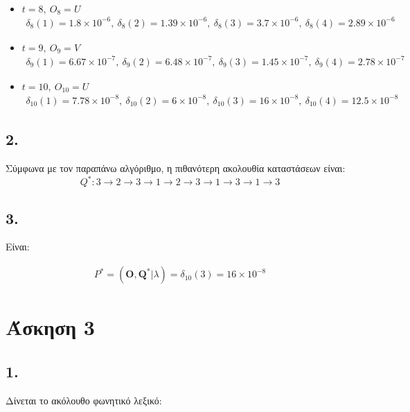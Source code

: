 \documentclass[12pt,a4paper]{article}
\begin{document}
\begin{itemize}
					\item $t=8, ~ O_8=U$
					\begin{align*}
						\delta_8\left(1\right) = 1.8\times10^{-6}, ~
						\delta_8\left(2\right) = 1.39\times10^{-6}, ~
						\boxed{\delta_8\left(3\right) = 3.7\times10^{-6}}, ~
						\delta_8\left(4\right) = 2.89\times10^{-6}
					\end{align*}

					\item $t=9, ~ O_9=V$
					\begin{align*}
						\boxed{\delta_9\left(1\right) = 6.67\times10^{-7}}, ~
						\delta_9\left(2\right) = 6.48\times10^{-7}, ~
						\delta_9\left(3\right) = 1.45\times10^{-7}, ~
						\delta_9\left(4\right) = 2.78\times10^{-7}
					\end{align*}

					\item $t=10, ~ O_{10}=U$
					\begin{align*}
						\delta_{10}\left(1\right) = 7.78\times10^{-8}, ~
						\delta_{10}\left(2\right) = 6\times10^{-8}, ~
						\boxed{\delta_{10}\left(3\right) = 16\times10^{-8}}, ~
						\delta_{10}\left(4\right) = 12.5\times10^{-8}
					\end{align*}
				\end{itemize}
		
		\subsection*{2.}
			Σύμφωνα με τον παραπάνω αλγόριθμο, η πιθανότερη ακολουθία καταστάσεων είναι: \\
			
			\[
				Q^*: 3\rightarrow2\rightarrow3\rightarrow1\rightarrow2\rightarrow3\rightarrow1\rightarrow3\rightarrow1\rightarrow3
			\]
		
		\subsection*{3.}
			Είναι:
			
			\begin{align*}
				P^* = (\textbf{O}, \textbf{Q}^*|\lambda) = \delta_{10}(3) = 16 \times 10^{-8}
			\end{align*}
	
	\section*{Άσκηση 3} 
		
		\subsection*{1.}
			Δίνεται το ακόλουθο φωνητικό λεξικό:
			
\end{document}
